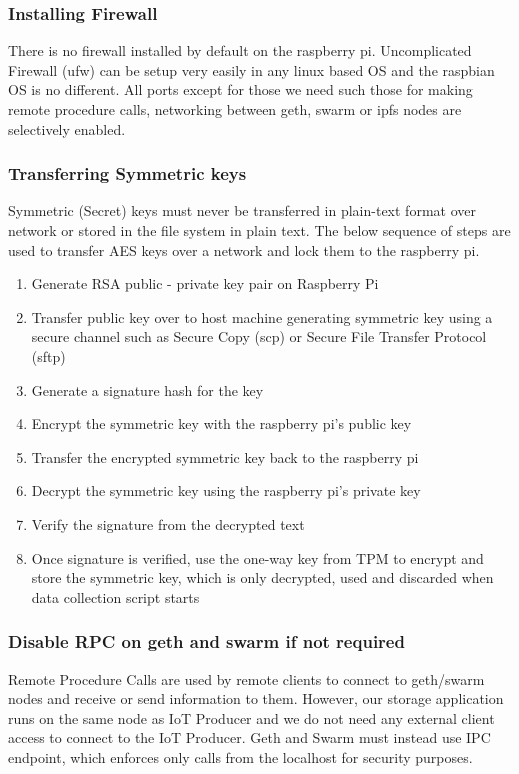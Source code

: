 \documentclass[11pt,openright]{report}
\begin{document}
\subsubsection{Installing Firewall}
There is no firewall installed by default on the raspberry pi. Uncomplicated Firewall (ufw) can be setup very easily in any linux based OS and the raspbian OS is no different. All ports except for those we need such those for making remote procedure calls, networking between geth, swarm or ipfs nodes are selectively enabled.

\subsubsection{Transferring Symmetric keys}
Symmetric (Secret) keys must never be transferred in plain-text format over network or stored in the file system in plain text. The below sequence of steps are used to transfer AES keys over a network and lock them to the raspberry pi.

\begin{enumerate}
	\item Generate RSA public - private key pair on Raspberry Pi
	\item Transfer public key over to host machine generating symmetric key using a secure channel such as Secure Copy (scp) or Secure File Transfer Protocol (sftp)
	\item Generate a signature hash for the key
	\item Encrypt the symmetric key with the raspberry pi's public key
	\item Transfer the encrypted symmetric key back to the raspberry pi
	\item Decrypt the symmetric key using the raspberry pi's private key
	\item Verify the signature from the decrypted text
	\item Once signature is verified, use the one-way key from TPM to encrypt and store the symmetric key, which is only decrypted, used and discarded when data collection script starts
\end{enumerate}

\subsubsection{Disable RPC on geth and swarm if not required}
Remote Procedure Calls are used by remote clients to connect to geth/swarm nodes and receive or send information to them. However, our storage application runs on the same node as IoT Producer and we do not need any external client access to connect to the IoT Producer. Geth and Swarm must instead use IPC endpoint, which enforces only calls from the localhost for security purposes.
\end{document}
